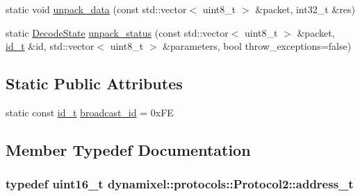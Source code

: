 \begin{DoxyCompactItemize}
\item 
static void \hyperlink{classdynamixel_1_1protocols_1_1_protocol2_aa9d44d665a21833f29b438efaec5d30f}{unpack\+\_\+data} (const std\+::vector$<$ uint8\+\_\+t $>$ \&packet, int32\+\_\+t \&res)
\item 
static \hyperlink{classdynamixel_1_1protocols_1_1_protocol2_ab779d109a8aeea8e2de436f6d23b43ed}{Decode\+State} \hyperlink{classdynamixel_1_1protocols_1_1_protocol2_adb5a8db2d554a4ee83f069f690d41f30}{unpack\+\_\+status} (const std\+::vector$<$ uint8\+\_\+t $>$ \&packet, \hyperlink{classdynamixel_1_1protocols_1_1_protocol2_a38d9cae72cd86213cca74e718c240429}{id\+\_\+t} \&id, std\+::vector$<$ uint8\+\_\+t $>$ \&parameters, bool throw\+\_\+exceptions=false)
\end{DoxyCompactItemize}
\subsection*{Static Public Attributes}
\begin{DoxyCompactItemize}
\item 
static const \hyperlink{classdynamixel_1_1protocols_1_1_protocol2_a38d9cae72cd86213cca74e718c240429}{id\+\_\+t} \hyperlink{classdynamixel_1_1protocols_1_1_protocol2_a1b0fd8890068abff759e758b27cf7869}{broadcast\+\_\+id} = 0x\+FE
\end{DoxyCompactItemize}


\subsection{Member Typedef Documentation}
\subsubsection[{\texorpdfstring{address\+\_\+t}{address_t}}]{\setlength{\rightskip}{0pt plus 5cm}typedef uint16\+\_\+t {\bf dynamixel\+::protocols\+::\+Protocol2\+::address\+\_\+t}}\hypertarget{classdynamixel_1_1protocols_1_1_protocol2_ac5d0ba762aa1f860c0187d9e64982941}{}\label{classdynamixel_1_1protocols_1_1_protocol2_ac5d0ba762aa1f860c0187d9e64982941}
